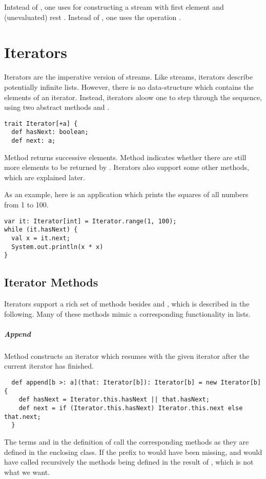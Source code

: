 \documentclass[a4paper,12pt,twoside,titlepage]{book}
\begin{document}
{Intstead of , one uses  for
constructing a stream with first element  and (unevaluated)
rest .  Instead of , one uses the operation
.  

\chapter{Iterators}

Iterators are the imperative version of streams. Like streams,
iterators describe potentially infinite lists. However, there is no
data-structure which contains the elements of an iterator. Instead, 
iterators aloow one to step through the sequence, using two abstract methods  and .
\begin{lstlisting}
trait Iterator[+a] {
  def hasNext: boolean;
  def next: a;
\end{lstlisting}
Method  returns successive elements.  Method 
indicates whether there are still more elements to be returned by
. Iterators also support some other methods, which are
explained later.

As an example, here is an application which prints the squares of all
numbers from 1 to 100.
\begin{lstlisting}
var it: Iterator[int] = Iterator.range(1, 100);
while (it.hasNext) {
  val x = it.next;
  System.out.println(x * x)
}
\end{lstlisting}

\section{Iterator Methods}

Iterators support a rich set of methods besides  and
, which is described in the following. Many of these
methods mimic a corresponding functionality in lists.

\paragraph{Append}
Method  constructs an iterator which resumes with the
given iterator  after the current iterator has finished.
\begin{lstlisting}
  def append[b >: a](that: Iterator[b]): Iterator[b] = new Iterator[b] {
    def hasNext = Iterator.this.hasNext || that.hasNext;
    def next = if (Iterator.this.hasNext) Iterator.this.next else that.next;
  }    
\end{lstlisting}
The terms  and 
in the definition of  call the corresponding methods as
they are defined in the enclosing  class.  If the
 prefix to  would have been missing,
 and  would have called recursively the
methods being defined in the result of , which is not
what we want.

}
\end{document}
